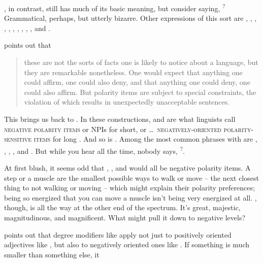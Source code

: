 , in contrast, still has much of its basic meaning, but consider saying, \textsuperscript{?} Grammatical, perhaps, but utterly bizarre. Other expressions of this sort are , , , , , , , , , , and  \citep[24]{Israel2011}.

\citet[3]{Israel2011} points out that

\begin{quote}
    these are not the sorts of facts one is likely to notice about a language, but they are remarkable nonetheless. One would expect that anything one could affirm, one could also deny, and that anything one could deny, one could also affirm. But polarity items are subject to special constraints, the violation of which results in unexpectedly unacceptable sentences.
\end{quote}

This brings us back to . In these constructions,  and  are what linguists call \textsc{negative polarity items} or NPIs for short, or \dots~\textsc{negatively-oriented polarity-sensitive items} for long \citep{cgel}. And so is . Among the most common phrases with  are , , , , and . But while you hear  all the time, nobody says, \textsuperscript{?}.

At first blush, it seems odd that , , and  would all be negative polarity items. A step or a muscle are the smallest possible ways to walk or move -- the next closest thing to not walking or moving -- which might explain their polarity preferences; being so energized that you can move a muscle isn't being very energized at all. , though, is all the way at the other end of the spectrum. It's great, majestic, magnitudinous, and magnificent. What might pull it down to negative levels?

\citet[82]{Israel2011} points out that degree modifiers like  apply not just to positively oriented adjectives like , but also to negatively oriented ones like . If something is much smaller than something else, it

